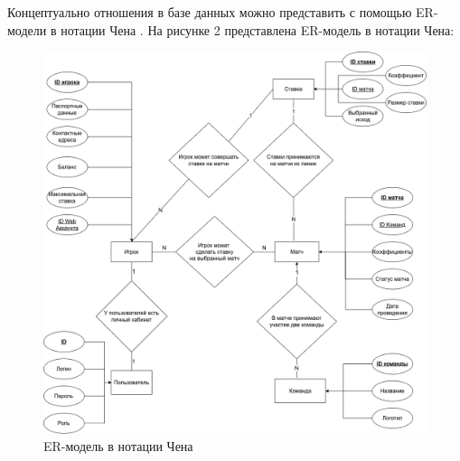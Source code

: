 Концептуально отношения в базе данных можно представить с помощью ER-модели в нотации Чена \cite{dbms}.
\newpage
На рисунке 2 представлена ER-модель в нотации Чена:
\FloatBarrier
\begin{figure}[hp]	
	\begin{center}
		\includegraphics[width=\linewidth]{inc/chen.png}
	\end{center}
	\captionsetup{justification=centering, labelsep=defffis}
	\caption{ER-модель в нотации Чена}
	\label{fig::chen}
\end{figure}
\FloatBarrier
